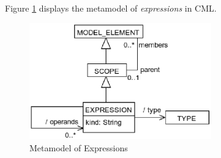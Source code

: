 Figure \ref{fig:meta:expressions} displays the metamodel of
\emph{expressions} in CML.

\begin{figure}[H]
\centering
\includegraphics[width=0.7\textwidth]{metamodel/expressions}
\caption{Metamodel of Expressions}
\label{fig:meta:expressions}
\end{figure}
